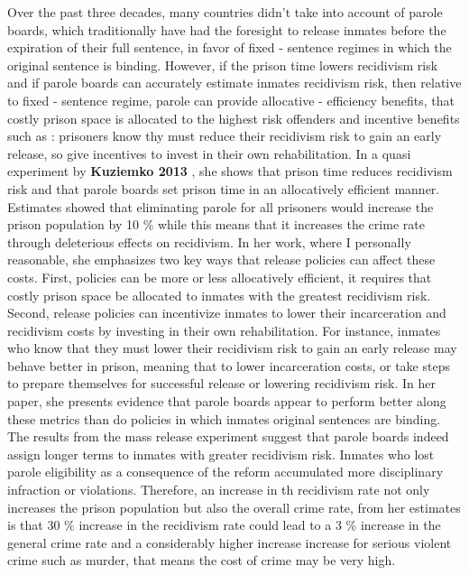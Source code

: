 \documentclass[a4paper,12pt]{article}
\begin{document}
Over the past three decades, many countries didn't take into account of parole boards, which traditionally have had the foresight to release inmates before the expiration of their full sentence, in favor of fixed - sentence regimes in which the original sentence is binding. However, if the prison time lowers recidivism risk and if parole boards can accurately estimate inmates recidivism risk, then relative to fixed - sentence regime, parole can provide allocative - efficiency benefits, that costly prison space is allocated to the highest risk offenders and incentive benefits such as : prisoners know thy must reduce their recidivism risk to gain an early release, so give incentives to invest in their own rehabilitation. In a quasi experiment by \textbf{Kuziemko 2013} \cite{Kuziemko2013}, she shows that prison time reduces recidivism risk and that parole boards set prison time in an allocatively efficient manner. Estimates showed that eliminating parole for all prisoners would increase the prison population by 10 \% while this means that it increases the crime rate through deleterious effects on recidivism. In her work, where I personally reasonable, she emphasizes two key ways that release policies can affect these costs. First, policies can be more or less allocatively efficient, it requires that costly prison space be allocated to inmates with the greatest recidivism risk. Second, release policies can incentivize inmates to lower their incarceration and recidivism costs by investing in their own rehabilitation. For instance, inmates who know that they must lower their recidivism risk to gain an early release may behave better in prison, meaning that to lower incarceration costs, or take steps to prepare themselves for successful release or lowering recidivism risk. In her paper, she presents evidence that parole boards  appear to perform better along these metrics than do policies in which inmates original sentences are binding. The results from the mass release experiment suggest that parole boards indeed assign longer terms to inmates with greater recidivism risk. Inmates who lost parole eligibility as a consequence of the reform accumulated more disciplinary infraction or violations. Therefore, an increase in th recidivism rate not only increases the prison population but also the overall crime rate, from her estimates is that 30 \% increase in the recidivism rate could lead to a 3 \% increase in the general crime rate and a considerably higher increase increase for serious violent crime such as murder, that means the cost of crime may be very high. 
\end{document}
